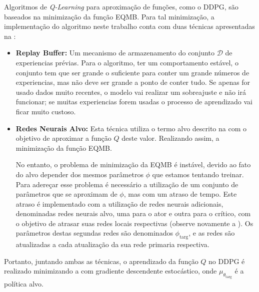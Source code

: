 
Algoritmos de \emph{Q-Learning} para aproximação de funções, como o \acrshort{DDPG}, são baseados na minimização da função \acrshort{EQMB}. Para tal minimização, a implementação do algoritmo neste trabalho conta com duas técnicas apresentadas na :

\begin{itemize}
    \item \textbf{Replay Buffer:} Um mecanismo de armazenamento do conjunto ${\mathcal D}$ de experiencias prévias. Para o algoritmo, ter um comportamento estável, o conjunto tem que ser grande o suficiente para conter um grande números de experiencias, mas não deve ser grande a ponto de conter tudo. Se apenas for usado dados muito recentes, o modelo vai realizar um sobreajuste e não irá funcionar; se muitas experiencias forem usadas o processo de aprendizado vai ficar muito custoso.
    
    \item \textbf{Redes Neurais Alvo:} Esta técnica utiliza o termo alvo descrito na  com o objetivo de aproximar a função $Q$ deste valor. Realizando assim, a minimização da função \acrshort{EQMB}.

    
    No entanto, o problema de minimização da \acrshort{EQMB} é instável, devido ao fato do alvo depender dos mesmos parâmetros $\phi$ que estamos tentando treinar. Para adereçar esse problema é necessário a utilização de um conjunto de parâmetros que se aproximam de $\phi$, mas com um atraso de tempo. Este atraso é implementado com a utilização de redes neurais adicionais, denominadas redes neurais alvo, uma para o ator e outra para o crítico, com o objetivo de atrasar suas redes locais respectivas (observe novamente a ). Os parâmetros destas segundas redes são denominados $\phi_{\text{targ}}$, e as redes são atualizadas a cada atualização da sua rede primaria respectiva.
\end{itemize}

Portanto, juntando ambas as técnicas, o aprendizado da função $Q$ no \acrshort{DDPG} é realizado minimizando a  com gradiente descendente estocástico, onde $\mu_{\theta_{\text{targ}}}$ é a política alvo.

